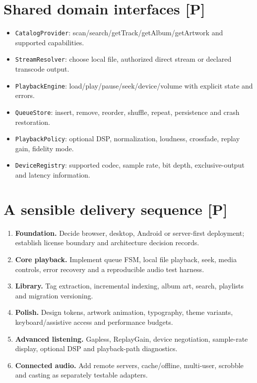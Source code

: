 \documentclass[10pt,a4paper,oneside]{report}
\begin{document}
\section*{Shared domain interfaces [P]}
\begin{itemize}[leftmargin=*]
\item \texttt{CatalogProvider}: scan/search/getTrack/getAlbum/getArtwork and supported capabilities.
\item \texttt{StreamResolver}: choose local file, authorized direct stream or declared transcode output.
\item \texttt{PlaybackEngine}: load/play/pause/seek/device/volume with explicit state and errors.
\item \texttt{QueueStore}: insert, remove, reorder, shuffle, repeat, persistence and crash restoration.
\item \texttt{PlaybackPolicy}: optional DSP, normalization, loudness, crossfade, replay gain, fidelity mode.
\item \texttt{DeviceRegistry}: supported codec, sample rate, bit depth, exclusive-output and latency information.
\end{itemize}
\section*{A sensible delivery sequence [P]}
\begin{enumerate}[leftmargin=*]
\item \textbf{Foundation.} Decide browser, desktop, Android or server-first deployment; establish license boundary and architecture decision records.
\item \textbf{Core playback.} Implement queue FSM, local file playback, seek, media controls, error recovery and a reproducible audio test harness.
\item \textbf{Library.} Tag extraction, incremental indexing, album art, search, playlists and migration versioning.
\item \textbf{Polish.} Design tokens, artwork animation, typography, theme variants, keyboard/assistive access and performance budgets.
\item \textbf{Advanced listening.} Gapless, ReplayGain, device negotiation, sample-rate display, optional DSP and playback-path diagnostics.
\item \textbf{Connected audio.} Add remote servers, cache/offline, multi-user, scrobble and casting as separately testable adapters.
\end{enumerate}
\end{document}
